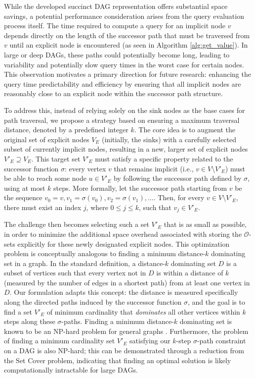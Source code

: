 While the developed succinct DAG representation offers substantial space savings, a potential performance consideration arises from the query evaluation process itself. The time required to compute a query for an implicit node $v$ depends directly on the length of the successor path that must be traversed from $v$ until an explicit node is encountered (as seen in Algorithm \ref{alg:get_value}). In large or deep DAGs, these paths could potentially become long, leading to variability and potentially slow query times in the worst case for certain nodes. This observation motivates a primary direction for future research: enhancing the query time predictability and efficiency by ensuring that all implicit nodes are reasonably close to an explicit node within the successor path structure.

To address this, instead of relying solely on the sink nodes as the base cases for path traversal, we propose a strategy based on ensuring a maximum traversal distance, denoted by a predefined integer $k$. The core idea is to augment the original set of explicit nodes $V_E$ (initially, the sinks) with a carefully selected subset of currently implicit nodes, resulting in a new, larger set of explicit nodes $V'_E \supseteq V_E$. This target set $V'_E$ must satisfy a specific property related to the successor function $\sigma$: every vertex $v$ that remains implicit (i.e., $v \in V \setminus V'_E$) must be able to reach some node $u \in V'_E$ by following the successor path defined by $\sigma$, using at most $k$ steps. More formally, let the successor path starting from $v$ be the sequence $v_0=v, v_1=\sigma(v_0), v_2=\sigma(v_1), \dots$. Then, for every $v \in V \setminus V'_E$, there must exist an index $j$, where $0 \le j \le k$, such that $v_j \in V'_E$.

The challenge then becomes selecting such a set $V'_E$ that is as small as possible, in order to minimize the additional space overhead associated with storing the $\mathcal{O}$-sets explicitly for these newly designated explicit nodes. This optimization problem is conceptually analogous to finding a minimum distance-$k$ dominating set in a graph. In the standard definition, a distance-$k$ dominating set $D$ is a subset of vertices such that every vertex not in $D$ is within a distance of $k$ (measured by the number of edges in a shortest path) from at least one vertex in $D$. Our formulation adapts this concept: the distance is measured specifically along the directed paths induced by the successor function $\sigma$, and the goal is to find a set $V'_E$ of minimum cardinality that \emph{dominates} all other vertices within $k$ steps along these $\sigma$-paths. Finding a minimum distance-$k$ dominating set is known to be an NP-hard problem for general graphs \cite{haynes2013fundamentals}. Furthermore, the problem of finding a minimum cardinality set $V'_E$ satisfying our $k$-step $\sigma$-path constraint on a DAG is also NP-hard; this can be demonstrated through a reduction from the Set Cover problem, indicating that finding an optimal solution is likely computationally intractable for large DAGs.

